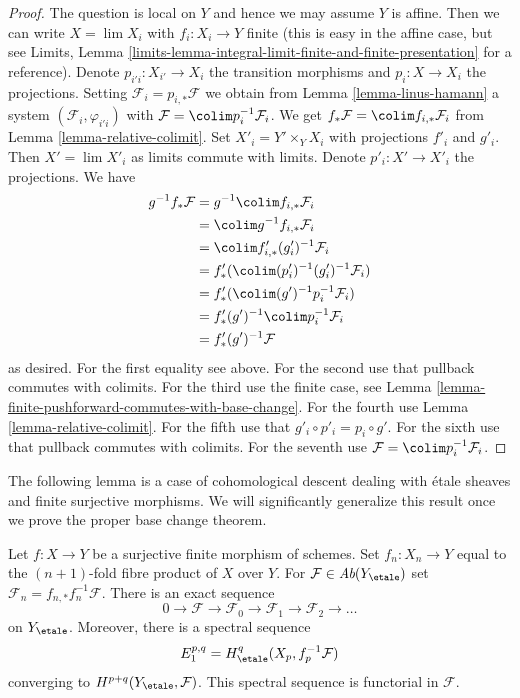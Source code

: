 \begin{proof}
The question is local on $Y$ and hence we may assume $Y$ is affine.
Then we can write $X = \lim X_i$ with $f_i : X_i \to Y$ finite
(this is easy in the affine case, but see
Limits, Lemma \ref{limits-lemma-integral-limit-finite-and-finite-presentation}
for a reference). Denote $p_{i'i} : X_{i'} \to X_i$
the transition morphisms and $p_i : X \to X_i$ the projections.
Setting $\mathcal{F}_i = p_{i, *}\mathcal{F}$ we obtain
from Lemma \ref{lemma-linus-hamann}
a system $(\mathcal{F}_i, \varphi_{i'i})$
with $\mathcal{F} = \colim p_i^{-1}\mathcal{F}_i$.
We get $f_*\mathcal{F} = \colim f_{i, *}\mathcal{F}_i$
from Lemma \ref{lemma-relative-colimit}.
Set $X'_i = Y' \times_Y X_i$ with projections $f'_i$ and $g'_i$.
Then $X' = \lim X'_i$ as limits commute with limits.
Denote $p'_i : X' \to X'_i$ the projections. We have
\begin{align*}
g^{-1}f_*\mathcal{F}
& =
g^{-1} \colim f_{i, *}\mathcal{F}_i \\
& =
\colim g^{-1}f_{i, *}\mathcal{F}_i \\
& =
\colim f'_{i, *}(g'_i)^{-1}\mathcal{F}_i \\
& =
f'_*(\colim (p'_i)^{-1}(g'_i)^{-1}\mathcal{F}_i) \\
& =
f'_*(\colim (g')^{-1}p_i^{-1}\mathcal{F}_i) \\
& =
f'_*(g')^{-1} \colim p_i^{-1}\mathcal{F}_i \\
& =
f'_*(g')^{-1}\mathcal{F}
\end{align*}
as desired. For the first equality see above.
For the second use that pullback commutes with colimits.
For the third use the finite case, see
Lemma \ref{lemma-finite-pushforward-commutes-with-base-change}.
For the fourth use Lemma \ref{lemma-relative-colimit}.
For the fifth use that $g'_i \circ p'_i = p_i \circ g'$.
For the sixth use that pullback commutes with colimits.
For the seventh use $\mathcal{F} = \colim p_i^{-1}\mathcal{F}_i$.
\end{proof}

\noindent
The following lemma is a case of cohomological descent dealing with
\'etale sheaves and finite surjective morphisms. We will significantly
generalize this result once we prove the proper base change theorem.

\begin{lemma}
\label{lemma-cohomological-descent-finite}
Let $f : X \to Y$ be a surjective finite morphism of schemes.
Set $f_n : X_n \to Y$ equal to the $(n + 1)$-fold fibre product
of $X$ over $Y$. For $\mathcal{F} \in \textit{Ab}(Y_\etale)$ set
$\mathcal{F}_n = f_{n, *}f_n^{-1}\mathcal{F}$. There is an exact
sequence
$$
0 \to \mathcal{F} \to \mathcal{F}_0 \to \mathcal{F}_1 \to
\mathcal{F}_2 \to \ldots
$$
on $Y_\etale$. Moreover, there is a spectral sequence
$$
E_1^{p, q} = H^q_\etale(X_p, f_p^{-1}\mathcal{F})
$$
converging to $H^{p + q}(Y_\etale, \mathcal{F})$.
This spectral sequence is functorial in $\mathcal{F}$.
\end{lemma}

